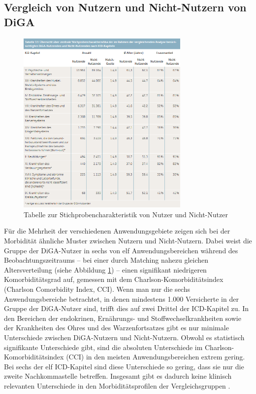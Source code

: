\documentclass{article}
\begin{document}
		\subsection{Vergleich von Nutzern und Nicht-Nutzern von DiGA}
			\begin{figure}[htbp]
				\centering
				\includegraphics[width=0.75\textwidth]{./grafiken/tabelle_vergleich_nutzer_nicht_nutzer_diga}
				\caption[Stichprobencharakteristik von Nutzer und Nicht-Nutzer]{Tabelle zur Stichprobencharakteristik von Nutzer und Nicht-Nutzer}
				\label{Tab-stichprobe-diga}
			\end{figure}
			Für die Mehrheit der verschiedenen Anwendungsgebiete zeigen sich bei der Morbidität ähnliche Muster zwischen Nutzern und Nicht-Nutzern. Dabei weist die Gruppe der DiGA-Nutzer in sechs von elf Anwendungsbereichen während des Beobachtungszeitraums – bei einer durch Matching nahezu gleichen Altersverteilung (siehe Abbildung \ref{Tab-stichprobe-diga}) – einen signifikant niedrigeren Komorbiditätsgrad auf, gemessen mit dem Charlson-Komorbiditätsindex (Charlson Comorbidity Index, CCI). Wenn man nur die sechs Anwendungsbereiche betrachtet, in denen mindestens 1.000 Versicherte in der Gruppe der DiGA-Nutzer sind, trifft dies auf zwei Drittel der ICD-Kapitel zu. In den Bereichen der endokrinen, Ernährungs- und Stoffwechselkrankheiten sowie der Krankheiten des Ohres und des Warzenfortsatzes gibt es nur minimale Unterschiede zwischen DiGA-Nutzern und Nicht-Nutzern. Obwohl es statistisch signifikante Unterschiede gibt, sind die absoluten Unterschiede im Charlson-Komorbiditätsindex (CCI) in den meisten Anwendungsbereichen extrem gering. Bei sechs der elf ICD-Kapitel sind diese Unterschiede so gering, dass sie nur die zweite Nachkommastelle betreffen. Insgesamt gibt es dadurch keine klinisch relevanten Unterschiede in den Morbiditätsprofilen der Vergleichsgruppen \cite[vgl. S. 36]{TK-Report-2}.
			
\end{document}
